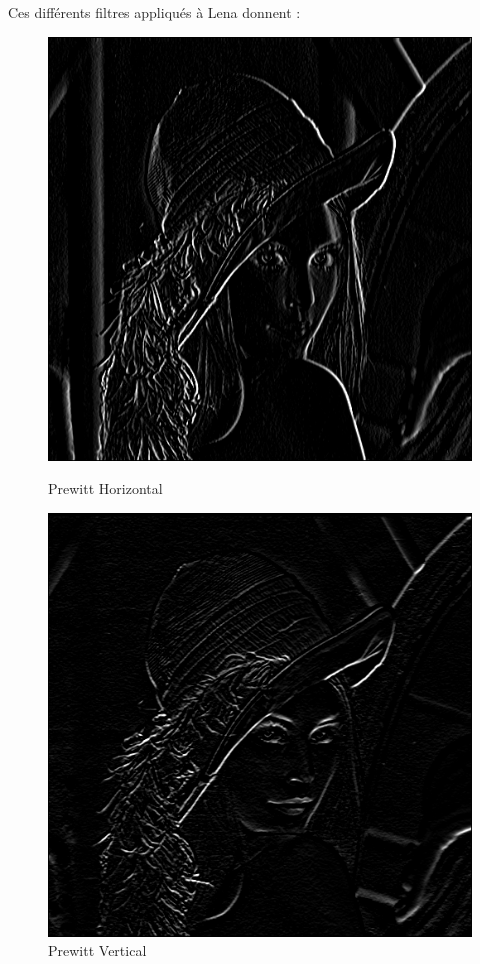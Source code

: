 \documentclass[11pt]{article}
\begin{document}
	Ces différents filtres appliqués à Lena donnent : 

	\begin{figure}[H]
		\begin{minipage}[c]{.46\linewidth}
			\centering
			\includegraphics[scale=0.25]{Image/filtrePrewittHorizontal.png}
			\caption{Prewitt Horizontal}
			\label{fig:PrewittHorizontal}
		\end{minipage} \hfill
		\begin{minipage}[c]{.46\linewidth}
		\centering
			\includegraphics[scale=0.25]{Image/filtrePrewittVertical.png}
			\caption{Prewitt Vertical}
			\label{fig:PrewittVertical}
		\end{minipage}
	\end{figure}
\end{document}
